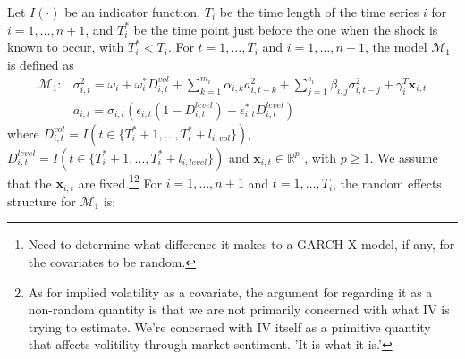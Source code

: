\documentclass[11pt]{article}
\newcommand{\R}{\mathbb{R}}
\newcommand{\x}{\textbf{x}}
\def\mbf#1{\mathbf{#1}} %
\def\mc#1{\mathcal{#1}} %
\def\mc#1{\mathcal{#1}}
\theoremstyle{definition}
\begin{document}
Let $I(\cdot)$ be an indicator function, $T_i$ be the time length of the time series $i$ for $i = 1, \ldots, n+1$, and $T_i^*$ be the time point just before the one when the shock is known to occur, with $T_i^* < T_i$.  For $t= 1, \ldots, T_i$ and $i = 1, \ldots, n+1$, the model $\mc{M}_1$ is defined as
\begin{align}
\mc{M}_1 \colon &\sigma^{2}_{i,t} = \omega_{i} + \omega^{*}_i D^{vol}_{i,t}  + \sum^{m_{i}}_{k=1}\alpha_{i,k}a^{2}_{i,t-k} + \sum_{j=1}^{s_{i}}\beta_{i,j}\sigma_{i,t-j}^{2} + \gamma_{i}^{T} 
          \x_{i,t}\\
&a_{i,t} = \sigma_{i,t}(\epsilon_{i,t}(1-D^{level}_{i,t}) + \epsilon^{*}_{i,t}D^{level}_{i,t}) \label{equation1}
\end{align}
 where $D^{vol}_{i,t} = I(t \in \{T_i^* + 1,...,T_i^* + l_{i, vol}\})$, $D^{level}_{i,t} = I(t \in \{T_i^* + 1,...,T_i^* + l_{i, level}\})$ 
and $\x_{i,t} \in \R^{p}$ , with $p \geq 1$.  We assume that the 
$\mbf{x}_{i,t}$ are fixed.\footnote{Need to determine what difference it makes to a GARCH-X model, if any, for the covariates to be random.}\footnote{As for implied volatility as a covariate, the argument for regarding it as a non-random quantity is that we are not primarily concerned with what IV is trying to estimate.  We're concerned with IV itself as a primitive quantity that affects volitility through market sentiment. 'It is what it is.'}  For $i = 1, \ldots, n+1$ and $t=1, \ldots, T_i$, the random effects structure for $\mc{M}_1$ is:
\end{document}
